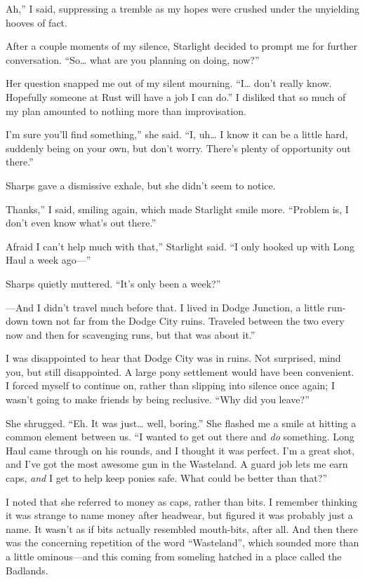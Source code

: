 \leavevmode{}Ah,” I said, suppressing a tremble as my hopes were crushed under the unyielding hooves of fact.

After a couple moments of my silence, Starlight decided to prompt me for further conversation. “So… what are you planning on doing, now?”

Her question snapped me out of my silent mourning. “I… don’t really know. Hopefully someone at Rust will have a job I can do.” I disliked that so much of my plan amounted to nothing more than improvisation.

\leavevmode{}I’m sure you’ll find something,” she said. “I, uh… I know it can be a little hard, suddenly being on your own, but don’t worry. There’s plenty of opportunity out there.”

Sharps gave a dismissive exhale, but she didn’t seem to notice.

\leavevmode{}Thanks,” I said, smiling again, which made Starlight smile more. “Problem is, I don’t even know what’s out there.”

\leavevmode{}Afraid I can’t help much with that,” Starlight said. “I only hooked up with Long Haul a week ago—”

Sharps quietly muttered. “It’s only been a week?”

\leavevmode{}—And I didn’t travel much before that. I lived in Dodge Junction, a little run-down town not far from the Dodge City ruins. Traveled between the two every now and then for scavenging runs, but that was about it.”

I was disappointed to hear that Dodge City was in ruins. Not surprised, mind you, but still disappointed. A large pony settlement would have been convenient. I forced myself to continue on, rather than slipping into silence once again; I wasn’t going to make friends by being reclusive. “Why did you leave?”

She shrugged. “Eh. It was just… well, boring.” She flashed me a smile at hitting a common element between us. “I wanted to get out there and \textit{do} something. Long Haul came through on his rounds, and I thought it was perfect. I’m a great shot, and I’ve got the most awesome gun in the Wasteland. A guard job lets me earn caps, \textit{and} I get to help keep ponies safe. What could be better than that?”

I noted that she referred to money as caps, rather than bits. I remember thinking it was strange to name money after headwear, but figured it was probably just a name. It wasn’t as if bits actually resembled mouth-bits, after all. And then there was the concerning repetition of the word “Wasteland”, which sounded more than a little ominous—and this coming from someling hatched in a place called the Badlands.

